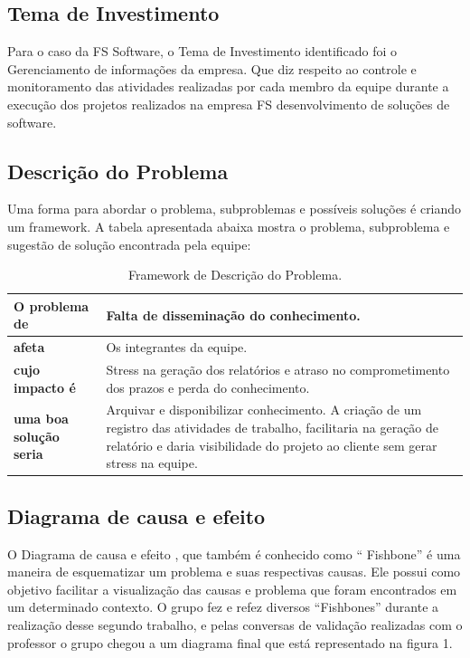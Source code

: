 \subsection{Tema de Investimento}
Para o caso da FS Software, o Tema de Investimento identificado foi o Gerenciamento de informações da empresa. Que diz respeito ao controle e monitoramento das atividades realizadas por cada membro da equipe durante a execução dos projetos realizados na empresa FS desenvolvimento de soluções de software.

\subsection{Descrição do Problema}
Uma  forma para abordar o problema, subproblemas e possíveis soluções  é criando um framework. A tabela  apresentada abaixa mostra o problema, subproblema e sugestão de solução encontrada pela equipe:

\begin{table}[H]
\caption{Framework de Descrição do Problema.}
\centering
\begin{tabular}{ | p{3cm} | p{9cm}| }
\hline
\textbf{O problema de} & Falta de disseminação do conhecimento.\\ \hline
\textbf{afeta} & Os integrantes da equipe. \\ \hline
\textbf{cujo impacto é} & Stress  na geração dos relatórios e atraso no comprometimento dos prazos e perda do conhecimento. \\ \hline
\textbf{uma boa solução seria} & Arquivar e disponibilizar conhecimento. A criação de um registro das atividades de trabalho, facilitaria na geração de relatório e daria  visibilidade do projeto ao cliente sem gerar stress na equipe. \\ \hline
\end{tabular}
\end{table}

\subsection{Diagrama de causa e efeito}
O Diagrama de causa e efeito , que também é conhecido como “ Fishbone” é uma maneira de esquematizar um problema e suas respectivas causas. Ele possui como objetivo facilitar a visualização das causas e problema que foram encontrados em um determinado contexto.
O grupo fez e refez diversos “Fishbones” durante a realização desse segundo trabalho, e pelas conversas de validação realizadas com o professor o grupo chegou a um diagrama final que está representado na figura 1.\\

